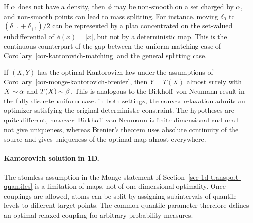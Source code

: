 \begin{rem}
	If $\alpha$ does not have a density, then $\phi$ may be non-smooth on a set charged by $\alpha$, and non-smooth points can lead to mass splitting. For instance, moving $\delta_0$ to $(\delta_{-1}+\delta_{+1})/2$ can be represented by a plan concentrated on the set-valued subdifferential of $\phi(x)=|x|$, but not by a deterministic map. This is the continuous counterpart of the gap between the uniform matching case of Corollary~\ref{cor-kantorovich-matching} and the general splitting case.
\end{rem}

\begin{rem}
	If $(X,Y)$ has the optimal Kantorovich law under the assumptions of Corollary~\ref{cor-monge-kantorovich-brenier}, then $Y=T(X)$ almost surely with $X\sim\alpha$ and $T(X)\sim\beta$. This is analogous to the Birkhoff--von Neumann result in the fully discrete uniform case: in both settings, the convex relaxation admits an optimizer satisfying the original deterministic constraint. The hypotheses are quite different, however: Birkhoff--von Neumann is finite-dimensional and need not give uniqueness, whereas Brenier's theorem uses absolute continuity of the source and gives uniqueness of the optimal map almost everywhere.
\end{rem}

\paragraph{Kantorovich solution in 1D.}\label{sec-1d-kantorovich-solution}

The atomless assumption in the Monge statement of Section~\ref{sec-1d-transport-quantiles} is a limitation of maps, not of one-dimensional optimality. Once couplings are allowed, atoms can be split by assigning subintervals of quantile levels to different target points. The common quantile parameter therefore defines an optimal relaxed coupling for arbitrary probability measures.

